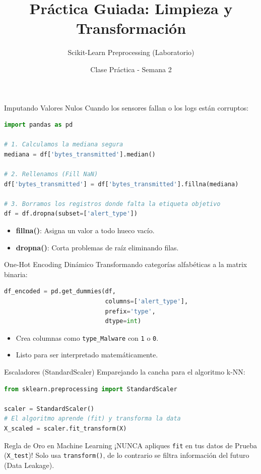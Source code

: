\documentclass[aspectratio=169]{beamer}
\title{Práctica Guiada: Limpieza y Transformación}
\subtitle{Scikit-Learn Preprocessing (Laboratorio)}
\author{Clase Práctica - Semana 2}
\date{}
\begin{document}
\begin{frame}
    \titlepage
\end{frame}

\begin{frame}[fragile]{Imputando Valores Nulos}
    Cuando los sensores fallan o los logs están corruptos:
    
\begin{lstlisting}[language=Python]
import pandas as pd

# 1. Calculamos la mediana segura
mediana = df['bytes_transmitted'].median()

# 2. Rellenamos (Fill NaN)
df['bytes_transmitted'] = df['bytes_transmitted'].fillna(mediana)

# 3. Borramos los registros donde falta la etiqueta objetivo
df = df.dropna(subset=['alert_type'])
\end{lstlisting}
    
    \begin{itemize}
        \item \textbf{\textcolor{VerdeAzulado}{fillna()}}: Asigna un valor a todo hueco vacío.
        \item \textbf{\textcolor{AzulMarino}{dropna()}}: Corta problemas de raíz eliminando filas.
    \end{itemize}
\end{frame}

\begin{frame}[fragile]{One-Hot Encoding Dinámico}
    Transformando categorías alfabéticas a la matrix binaria:
    
\begin{lstlisting}[language=Python]
df_encoded = pd.get_dummies(df, 
                            columns=['alert_type'], 
                            prefix='type', 
                            dtype=int)
\end{lstlisting}
    
    \begin{itemize}
        \item Crea columnas como \texttt{type\_Malware} con \texttt{1} o \texttt{0}.
        \item Listo para ser interpretado matemáticamente.
    \end{itemize}
\end{frame}

\begin{frame}[fragile]{Escaladores (StandardScaler)}
    Emparejando la cancha para el algoritmo k-NN:
    
\begin{lstlisting}[language=Python]
from sklearn.preprocessing import StandardScaler

scaler = StandardScaler()
# El algoritmo aprende (fit) y transforma la data
X_scaled = scaler.fit_transform(X)
\end{lstlisting}
    
    \begin{alertblock}{Regla de Oro en Machine Learning}
    ¡NUNCA apliques \texttt{fit} en tus datos de Prueba (\texttt{X\_test})! Solo usa \texttt{transform()}, de lo contrario se filtra información del futuro (Data Leakage).
    \end{alertblock}
\end{frame}
\end{document}
